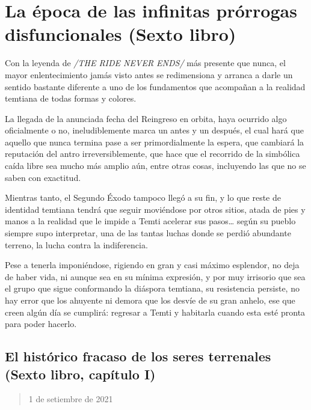 \documentclass[
  spanish,
]{book}
\begin{document}
\hypertarget{la-uxe9poca-de-las-infinitas-pruxf3rrogas-disfuncionales-sexto-libro}{%
\chapter{La época de las infinitas prórrogas disfuncionales (Sexto libro)}\label{la-uxe9poca-de-las-infinitas-pruxf3rrogas-disfuncionales-sexto-libro}}

Con la leyenda de \emph{/THE RIDE NEVER ENDS/} más presente que nunca, el mayor enlentecimiento jamás visto antes se redimensiona y arranca a darle un sentido bastante diferente a uno de los fundamentos que acompañan a la realidad temtiana de todas formas y colores.

La llegada de la anunciada fecha del Reingreso en orbita, haya ocurrido algo oficialmente o no, ineludiblemente marca un antes y un después, el cual hará que aquello que nunca termina pase a ser primordialmente la espera, que cambiará la reputación del antro irreversiblemente, que hace que el recorrido de la simbólica caída libre sea mucho más amplio aún, entre otras cosas, incluyendo las que no se saben con exactitud.

Mientras tanto, el Segundo Éxodo tampoco llegó a su fin, y lo que reste de identidad temtiana tendrá que seguir moviéndose por otros sitios, atada de pies y manos a la realidad que le impide a Temti acelerar sus pasos\ldots{} según su pueblo siempre supo interpretar, una de las tantas luchas donde se perdió abundante terreno, la lucha contra la indiferencia.

Pese a tenerla imponiéndose, rigiendo en gran y casi máximo esplendor, no deja de haber vida, ni aunque sea en su mínima expresión, y por muy irrisorio que sea el grupo que sigue conformando la diáspora temtiana, su resistencia persiste, no hay error que los ahuyente ni demora que los desvíe de su gran anhelo, ese que creen algún día se cumplirá: regresar a Temti y habitarla cuando esta esté pronta para poder hacerlo.

\hypertarget{el-histuxf3rico-fracaso-de-los-seres-terrenales-sexto-libro-capuxedtulo-i}{%
\section{El histórico fracaso de los seres terrenales (Sexto libro, capítulo I)}\label{el-histuxf3rico-fracaso-de-los-seres-terrenales-sexto-libro-capuxedtulo-i}}

\begin{quote}
1 de setiembre de 2021
\end{quote}
\end{document}
